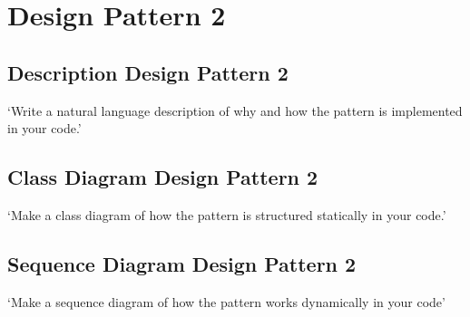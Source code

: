 \section{Design Pattern 2}

\subsection{Description Design Pattern 2}
`Write a natural language description of why and how the pattern is implemented in your code.'

\subsection{Class Diagram Design Pattern 2}
`Make a class diagram of how the pattern is structured statically in your code.'

\subsection{Sequence Diagram Design Pattern 2}
`Make a sequence diagram of how the pattern works dynamically in your code'